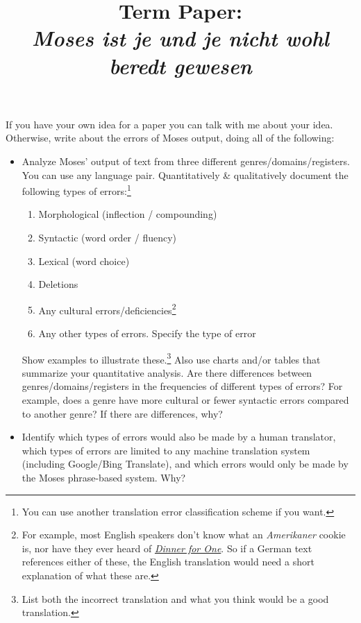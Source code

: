 \documentclass[10pt]{article}
\title{Term Paper: \\[1.0em] \Large{\textit{Moses ist je und je nicht wohl beredt gewesen}}}
\begin{document}
\maketitle


\begin{spacing}{1.35}

If you have your own idea for a paper you can talk with me about your idea.
Otherwise, write about the errors of Moses output, doing all of the following:

\begin{itemize}
\item Analyze Moses' output of text from three different genres/domains/registers.
	You can use any language pair.
	Quantitatively \& qualitatively document the following types of errors:\footnote{You can use another translation error classification scheme if you want.}
 \begin{spacing}{0.9}
 \begin{enumerate}
  \item Morphological (inflection / compounding)
  \item Syntactic (word order / fluency)
  \item Lexical (word choice)
  \item Deletions
  \item Any cultural errors/deficiencies\footnote{For example, most English speakers don't know what an \textit{Amerikaner} cookie is, nor have they ever heard of \href{https://en.wikipedia.org/wiki/Dinner_for_One}{\textit{Dinner for One}}.  So if a German text references either of these, the English translation would need a short explanation of what these are.}
  \item Any other types of errors.  Specify the type of error
 \end{enumerate}
 \end{spacing}

 Show examples to illustrate these.\footnote{List both the incorrect translation and what you think would be a good translation.}
 Also use charts and/or tables that summarize your quantitative analysis.
 Are there differences between genres/domains/registers in the frequencies of different types of errors?
 For example, does a genre have more cultural or fewer syntactic errors compared to another genre?
 If there are differences, why?

\item Identify which types of errors would also be made by a human translator, which types of errors are limited to any machine translation system (including Google/Bing Translate), and which errors would only be made by the Moses phrase-based system.
	Why?


\end{itemize}
\end{spacing}
\end{document}
